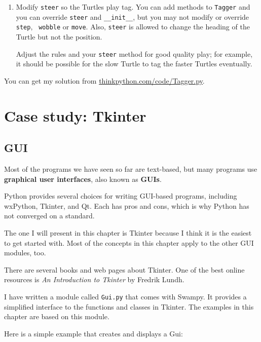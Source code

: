 \documentclass[10pt]{book}
\begin{document}
\begin{ex}
\begin{enumerate}
\item Modify {\tt steer} so the Turtles play tag.  You can add methods
  to {\tt Tagger} and you can override {\tt steer} and
  \verb"__init__", but you may not modify or override {\tt step}, {\tt
    wobble} or {\tt move}.  Also, {\tt steer} is allowed to change the
  heading of the Turtle but not the position.

Adjust the rules and your {\tt steer} method for good quality play;
for example, it should be possible for the slow Turtle to tag the
faster Turtles eventually.

\end{enumerate}

You can get my solution from \url{thinkpython.com/code/Tagger.py}.
\end{ex}



\chapter{Case study: Tkinter}

\section{GUI}

Most of the programs we have seen so far are text-based, but
many programs use {\bf graphical user interfaces}, also
known as {\bf GUIs}.


Python provides several choices for writing GUI-based programs,
including wxPython, Tkinter, and Qt.  Each has pros and cons, which
is why Python has not converged on a standard.

The one I will present in this chapter is Tkinter because I think
it is the easiest to get started with.  Most of the concepts
in this chapter apply to the other GUI modules, too.

There are several books and web pages about Tkinter.  One of
the best online resources is {\em An Introduction to Tkinter}
by Fredrik Lundh.


I have written a module called {\tt Gui.py} that comes with
Swampy.  It provides a simplified interface to the functions
and classes in Tkinter.  The examples in this chapter are
based on this module.

Here is a simple example that creates and displays a Gui:
\end{document}
